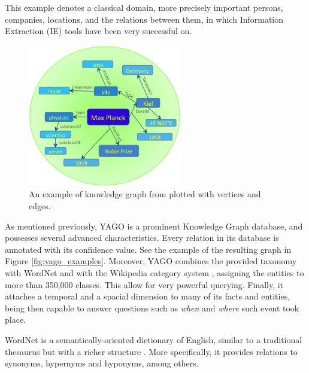 \documentclass[11pt,a4paper,openright]{memoir}
\begin{document}
This example denotes a classical domain, more precisely important persons, companies, locations, and the relations between them, in which Information Extraction (IE) tools have been very successful on.

\begin{figure}[!htbp]
  \centering
    \includegraphics[width=0.6\textwidth]{./images/yago_graph}
  \caption[An example of knowledge graph plotted with vertices and edges.]{An example of knowledge graph from \cite{Suchanek2007} plotted with vertices and edges.}
  \label{fig:yago_knowledge_graph}
\end{figure}

As mentioned previously, YAGO \cite{Suchanek2007} is a prominent Knowledge Graph database, and possesses several advanced characteristics. Every relation in its database is annotated with its confidence value. See the example of the resulting graph in Figure \ref{fig:yago_examples}. Moreover, YAGO combines the provided taxonomy with WordNet \cite{Miller:1995:WLD:219717.219748} and with the Wikipedia category system \cite{wiki}, assigning the entities to more than 350,000 classes. This allow for very powerful querying. Finally, it attaches a temporal and a spacial dimension to many of its facts and entities, being then capable to answer questions such as \emph{when} and \emph{where} such event took place.

WordNet is a semantically-oriented dictionary of English, similar to a traditional thesaurus but with a richer structure \cite{BirdKleinLoper09}. More specifically, it provides relations to synonyms, hypernyms and hyponyms, among others.
\end{document}
